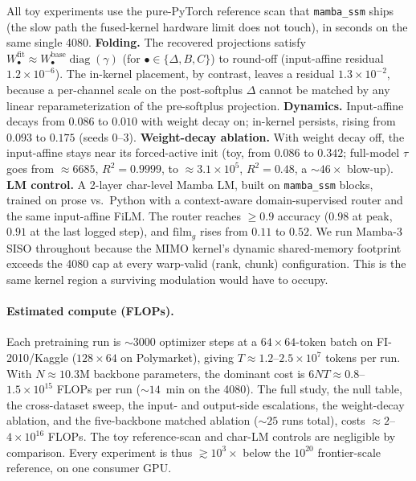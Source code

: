 \documentclass{article}
\DeclareMathOperator{\diagop}{diag}
\newcommand{\diag}{\diagop}
\begin{document}
All toy experiments use the pure-PyTorch reference scan that \texttt{mamba\_ssm}
ships (the slow path the fused-kernel hardware limit does not touch), in seconds on
the same single 4080. \textbf{Folding.} The recovered projections satisfy
$W_\bullet^{\text{fit}}\approx W_\bullet^{\text{base}}\diag(\gamma)$ (for
$\bullet\in\{\Delta,B,C\}$) to round-off
(input-affine residual $1.2\times10^{-6}$). The in-kernel placement, by contrast,
leaves a residual $1.3\times10^{-2}$, because a per-channel scale on the
post-softplus $\Delta$ cannot be matched by any linear reparameterization of the
pre-softplus projection. \textbf{Dynamics.} Input-affine decays from
$0.086$ to $0.010$ with weight decay on; in-kernel persists, rising from
$0.093$ to $0.175$ (seeds 0--3). \textbf{Weight-decay ablation.} With weight
decay off, the input-affine stays near its forced-active init (toy, from
$0.086$ to $0.342$; full-model $\tau$ goes from $\approx6685$, $R^2{=}0.9999$, to
$\approx3.1\times10^5$, $R^2{=}0.48$, a ${\sim}46\times$ blow-up). \textbf{LM control.} A 2-layer char-level
Mamba LM, built on \texttt{mamba\_ssm} blocks, trained on prose vs.\ Python with a
context-aware domain-supervised router and the same input-affine FiLM. The router
reaches $\ge0.9$ accuracy ($0.98$ at peak, $0.91$ at the last logged step), and
$\mathrm{film}_g$ rises from $0.11$ to $0.52$. We
run Mamba-3 SISO throughout because the MIMO kernel's dynamic shared-memory
footprint exceeds the 4080 cap at every warp-valid (rank, chunk) configuration.
This is the same kernel region a surviving modulation would have to occupy.

\paragraph{Estimated compute (FLOPs).}
Each pretraining run is ${\sim}3000$ optimizer steps at a $64{\times}64$-token
batch on FI-2010/Kaggle ($128{\times}64$ on Polymarket), giving
$T\approx1.2$--$2.5\times10^7$ tokens per run. With $N\approx10.3$M backbone
parameters, the dominant cost is $6NT\approx0.8$--$1.5\times10^{15}$ FLOPs per
run (${\sim}14$~min on the 4080). The full study, the null table, the
cross-dataset sweep, the input- and output-side escalations, the weight-decay
ablation, and the five-backbone matched ablation (${\sim}25$ runs total), costs
${\approx}2$--$4\times10^{16}$ FLOPs. The toy reference-scan and char-LM
controls are negligible by comparison. Every experiment is thus
$\gtrsim10^{3}\times$ below the $10^{20}$ frontier-scale reference, on one
consumer GPU.
\end{document}
